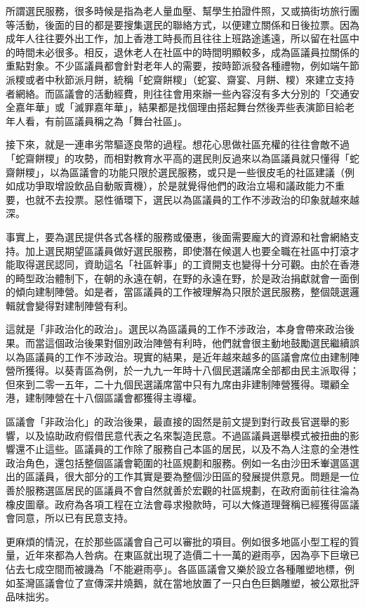 所謂選民服務，很多時候是指為老人量血壓、幫學生拍證件照，又或搞街坊旅行團等活動，後面的目的都是要搜集選民的聯絡方式，以便建立關係和日後拉票。因為成年人往往要外出工作，加上香港工時長而且往往上班路途遙遠，所以留在社區中的時間未必很多。相反，退休老人在社區中的時間明顯較多，成為區議員拉關係的重點對象。不少區議員都會針對老年人的需要，按時節派發各種禮物，例如端午節派糭或者中秋節派月餅，統稱「蛇齋餅糭」（蛇宴、齋宴、月餅、糭）來建立支持者網絡。而區議會的活動經費，則往往會用來辦一些內容沒有多大分別的「交通安全嘉年華」或「滅罪嘉年華」，結果都是找個理由搭起舞台然後弄些表演節目給老年人看，有前區議員稱之為「舞台社區」。

接下來，就是一連串劣幣驅逐良幣的過程。想花心思做社區充權的往往會敵不過「蛇齋餅糭」的攻勢，而相對教育水平高的選民則反過來以為區議員就只懂得「蛇齋餅糭」，以為區議會的功能只限於選民服務，或只是一些很皮毛的社區建議（例如成功爭取增設飲品自動販賣機），於是就覺得他們的政治立場和議政能力不重要，也就不去投票。惡性循環下，選民以為區議員的工作不涉政治的印象就越來越深。

事實上，要為選民提供各式各樣的服務或優惠，後面需要龐大的資源和社會網絡支持。加上選民期望區議員做好選民服務，即使潛在候選人也要全職在社區中打滾才能取得選民認同，資助這名「社區幹事」的工資開支也變得十分可觀。由於在香港的畸型政治體制下，在朝的永遠在朝，在野的永遠在野，於是政治捐獻就會一面倒的傾向建制陣營。如是者，當區議員的工作被理解為只限於選民服務，整個競選邏輯就會變得對建制陣營有利。

這就是「非政治化的政治」。選民以為區議員的工作不涉政治，本身會帶來政治後果。而當這個政治後果對個別政治陣營有利時，他們就會很主動地鼓勵選民繼續誤以為區議員的工作不涉政治。現實的結果，是近年越來越多的區議會席位由建制陣營所獲得。以葵青區為例，於一九九一年時十八個民選議席全部都由民主派取得；但來到二零一五年，二十九個民選議席當中只有九席由非建制陣營獲得。環顧全港，建制陣營在十八個區議會都獲得主導權。

區議會「非政治化」的政治後果，最直接的固然是前文提到對行政長官選舉的影響，以及協助政府假借民意代表之名來製造民意。不過區議員選舉模式被扭曲的影響還不止這些。區議員的工作除了服務自己本區的居民，以及不為人注意的全港性政治角色，還包括整個區議會範圍的社區規劃和服務。例如一名由沙田禾輋選區選出的區議員，很大部分的工作其實是要為整個沙田區的發展提供意見。問題是一位善於服務選區居民的區議員不會自然就善於宏觀的社區規劃，在政府面前往往淪為橡皮圖章。政府為各項工程在立法會尋求撥款時，可以大條道理聲稱已經獲得區議會同意，所以已有民意支持。

更麻煩的情況，在於那些區議會自己可以審批的項目。例如很多地區小型工程的質量，近年來都為人咎病。在東區就出現了造價二十一萬的避雨亭，因為亭下巨墩已佔去七成空間而被譏為「不能避雨亭」。各區區議會又樂於設立各種雕塑地標，例如荃灣區議會位了宣傳深井燒鵝，就在當地放置了一只白色巨鵝雕塑，被公眾批評品味拙劣。

